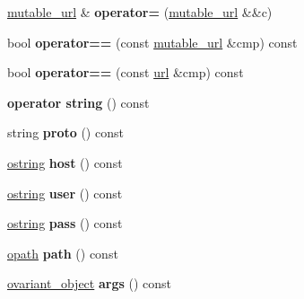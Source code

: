 \begin{DoxyCompactItemize}
\mbox{\label{classfc_1_1mutable__url_a9d85680287d15b6fab2a65751f6c689a}} 
\mbox{\hyperlink{classfc_1_1mutable__url}{mutable\+\_\+url}} \& {\bfseries operator=} (\mbox{\hyperlink{classfc_1_1mutable__url}{mutable\+\_\+url}} \&\&c)
\item 
\mbox{\label{classfc_1_1mutable__url_a3ec93ac122ce1020149acb6523d44e7d}} 
bool {\bfseries operator==} (const \mbox{\hyperlink{classfc_1_1mutable__url}{mutable\+\_\+url}} \&cmp) const
\item 
\mbox{\label{classfc_1_1mutable__url_a33f20a4a43d624c863a2529cfccd02c1}} 
bool {\bfseries operator==} (const \mbox{\hyperlink{classfc_1_1url}{url}} \&cmp) const
\item 
\mbox{\label{classfc_1_1mutable__url_a5799f73986cf03b80babc4fa031654e1}} 
{\bfseries operator string} () const
\item 
\mbox{\label{classfc_1_1mutable__url_a81c2ed7f8bd4378c0f9186c0d5461c4d}} 
string {\bfseries proto} () const
\item 
\mbox{\label{classfc_1_1mutable__url_a9a1c63c479b1612d9667c4eec424df50}} 
\mbox{\hyperlink{classfc_1_1optional}{ostring}} {\bfseries host} () const
\item 
\mbox{\label{classfc_1_1mutable__url_a1ab18477658498f3067c4025444633b0}} 
\mbox{\hyperlink{classfc_1_1optional}{ostring}} {\bfseries user} () const
\item 
\mbox{\label{classfc_1_1mutable__url_ad355c8b3a1fb3ac525b44189c18bcf70}} 
\mbox{\hyperlink{classfc_1_1optional}{ostring}} {\bfseries pass} () const
\item 
\mbox{\label{classfc_1_1mutable__url_a143844e6636de39b929187d6ddd2ae1f}} 
\mbox{\hyperlink{classfc_1_1optional}{opath}} {\bfseries path} () const
\item 
\mbox{\label{classfc_1_1mutable__url_a4960f7454fd27f95299271ef360a83be}} 
\mbox{\hyperlink{classfc_1_1optional}{ovariant\+\_\+object}} {\bfseries args} () const

\end{DoxyCompactItemize}
